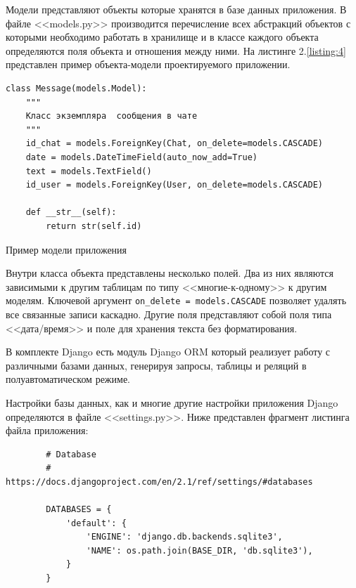 Модели представляют объекты которые хранятся в базе данных приложения. В файле <<models.py>> производится перечисление всех абстракций объектов с которыми необходимо работать в хранилище и в классе каждого объекта определяются поля объекта и отношения между ними. На листинге 2.\ref{listing:4} представлен пример объекта-модели проектируемого приложении. 

\begin{listing}[H]
\begin{verbatim}
class Message(models.Model):
    """
    Класс экземпляра  сообщения в чате
    """
    id_chat = models.ForeignKey(Chat, on_delete=models.CASCADE)
    date = models.DateTimeField(auto_now_add=True)
    text = models.TextField()
    id_user = models.ForeignKey(User, on_delete=models.CASCADE)

    def __str__(self):
        return str(self.id)

\end{verbatim}
\caption{Пример модели приложения}
\label{listing:4}
\end{listing}

Внутри класса объекта представлены несколько полей. Два из них являются зависимыми к другим таблицам по типу <<многие-к-одному>> к другим моделям. Ключевой аргумент \texttt{on_delete = models.CASCADE} позволяет удалять все связанные записи каскадно. Другие поля представляют собой поля типа <<дата/время>> и поле для хранения текста без форматирования. 

В комплекте Django есть модуль Django ORM который реализует работу с различными базами данных, генерируя запросы, таблицы и реляций в полуавтоматическом режиме. 

Настройки базы данных, как и многие другие настройки приложения Django определяются в файле <<settings.py>>. Ниже представлен фрагмент листинга файла приложения: 

\begin{minipage}{0.9\textwidth}
        \begin{verbatim}
        # Database
        # https://docs.djangoproject.com/en/2.1/ref/settings/#databases
        
        DATABASES = {
            'default': {
                'ENGINE': 'django.db.backends.sqlite3',
                'NAME': os.path.join(BASE_DIR, 'db.sqlite3'),
            }
        }
        \end{verbatim}
\end{minipage}\\[1.5pt]

